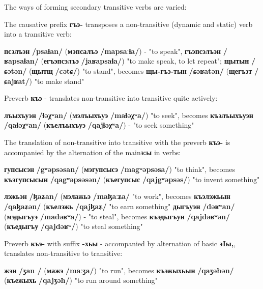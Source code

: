 \documentclass[a4paper,12pt]{book}
\newcommand{\1}[1]{\textbf{\emph{#1}}} %
\newcommand{\2}[1]{\textbf{[#1]}} %
\newcommand{\3}[1]{\fontsize{11pt}{0cm}\textbf{\emph{#1}}} %
\newcommand{\4}[1]{\fontsize{10pt}{0cm}\emph{#1}}	%
\newcommand{\5}[1]{\textbf{/#1/}} %
\newcommand{\6}[1]{\textbf{[#1]}} %
\newcommand{\7}[1]{\fontsize{12pt}{0cm}\emph{#1}} %
\newcommand{\8}[1]{\fontsize{12pt}{0cm}`#1'} %
\newcommand{\9}[1]{\fontsize{12pt}{0cm}(lit. `#1')} %
\newcommand{\glossphonemics}[1]{\textbf{/#1/}} %
\begin{document}
The ways of forming secondary transitive verbs are varied:
\begin{xlist}
\ex The causative prefix \textbf{гъэ-} transposes a non-transitive (dynamic and static) verb into a transitive verb: 
	\begin{xlist} 
	\ex \textbf{псэлъэн} \glossphonemics{psaɬan} (\textbf{мэпсалъэ} \glossphonemics{mapsaːɬa}) - "to speak", \textbf{гъэпсэлъэн} \glossphonemics{ʁapsaɬan} (\textbf{егъэпсэлъэ} \glossphonemics{jaʁapsaɬa}) "to make speak, to let repeat";
	\ex \textbf{щытын} \glossphonemics{ɕətən} (\textbf{щытщ} \glossphonemics{cətɕ}) "to stand", becomes \textbf{щы-гъэ-тын} \glossphonemics{ɕəʁatən} (\textbf{щегъэт} \glossphonemics{ɕajʁat}) "to make stand"
	\end{xlist}
\ex Preverb \textbf{къэ} - translates non-transitive into transitive quite actively:

	\begin{xlist}
	\ex \textbf{лъыхъуэн} \glossphonemics{ɬəχʷan} (\textbf{мэлъыхъуэ} \glossphonemics{maɬəχʷa}) "to seek", becomes \textbf{къэлъыхъуэн} \glossphonemics{qaɬəχʷan} (\textbf{къелъыхъуэ} \glossphonemics{qajɬəχʷa}) - "to seek something"
	\end{xlist}
	
\ex The translation of non-transitive into transitive with the preverb \textbf{къэ-} is accompanied by the alternation of the main\textbf{э:ы} in verbs: 
	\begin{xlist}
	\ex \textbf{гупсысэн} \glossphonemics{gʷəpsəsan} (\textbf{мэгупсысэ} \glossphonemics{magʷəpsəsa}) "to think", becomes \textbf{къэгупсысын} \glossphonemics{qagʷəpsəsən} (\textbf{къегупсыс} \glossphonemics{qajgʷəpsəs}) "to invent something"

	\ex \textbf{лэжьэн} \glossphonemics{ɮaʑan} (\textbf{мэлажьэ} \glossphonemics{maɮaːʑa} "to work", becomes \textbf{къэлэжьын} \glossphonemics{qaɮaʑən} (\textbf{къелэжь} \glossphonemics{qajɮaʑ} "to earn something"
	\ex \textbf{дыгъуэн} \glossphonemics{dəʁʷan} (\textbf{мэдыгъуэ} \glossphonemics{madəʁʷa}) - "to steal", becomes \textbf{къэдыгъун} \glossphonemics{qajdəʁʷən} (\textbf{къедыгъу} \glossphonemics{qajdəʁʷ}) "to steal something"
	\end{xlist}

\ex Preverb \textbf{къэ-} with suffix \textbf{-хьы} - accompanied by alternation of basic \textbf{эIы,}, translates non-transitive to transitive:
\begin{xlist} 
\ex \textbf{жэн} \glossphonemics{ʒan } (\textbf{мажэ}  \glossphonemics{maːʒa}) "to run", becomes \textbf{къэжыхьын } \glossphonemics{qaʒəħən} (\textbf{къежыхь}  \glossphonemics{qajʒəħ}) "to run around something"


\end{xlist}
\end{xlist}
\end{document}
